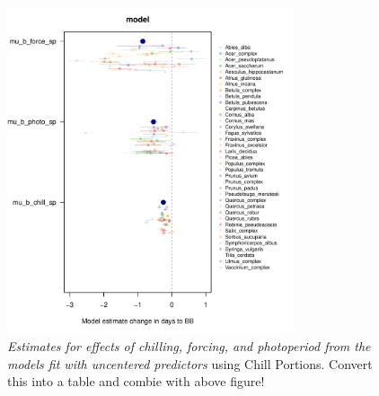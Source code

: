 \documentclass{article}
\begin{document}

\begin{figure}[h!]
\centering
\noindent \includegraphics[width=0.75\textwidth]{..//..//analyses/bb_analysis/figures/muplotmodelm2lni_spcompexprampfpcp_nonz.pdf}
\caption{\emph{Estimates for effects of chilling, forcing, and photoperiod from the models fit with uncentered predictors} using Chill Portions. Convert this into a table and combie with above figure!} 
\label{fig:mucpnonz}
\end{figure}
\end{document}
